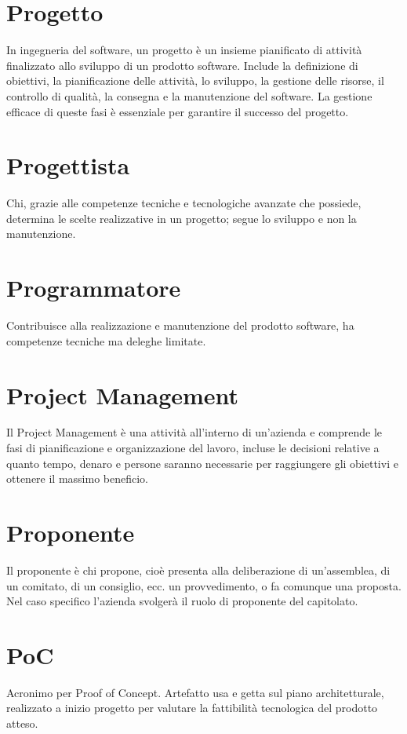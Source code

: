 \section{Progetto}\label{sec:Progetti}
In ingegneria del software, un progetto è un insieme pianificato di attività finalizzato allo sviluppo di un prodotto software. Include la definizione di obiettivi, la pianificazione delle attività, lo sviluppo, la gestione delle risorse, il controllo di qualità, la consegna e la manutenzione del software. La gestione efficace di queste fasi è essenziale per garantire il successo del progetto.

\section{Progettista}\label{sec:Progettisti}
Chi, grazie alle competenze tecniche e tecnologiche avanzate che possiede, determina le scelte realizzative in un progetto; segue lo sviluppo e non la manutenzione.

\section{Programmatore}\label{sec:Programmatori}
Contribuisce alla realizzazione e manutenzione del prodotto software, ha competenze tecniche ma deleghe limitate.

\section{Project Management}
Il Project Management è una attività all’interno di un’azienda e comprende le fasi di pianificazione e organizzazione del lavoro, incluse le decisioni relative a quanto tempo, denaro e persone saranno necessarie per raggiungere gli obiettivi e ottenere il massimo beneficio. 

\section{Proponente}\label{sec:Proponenti}
Il proponente è chi propone, cioè presenta alla deliberazione di un'assemblea, di un comitato, di un consiglio, ecc. un provvedimento, o fa comunque una proposta. Nel caso specifico l'azienda  svolgerà il ruolo di proponente del capitolato.

\section{PoC}\label{sec:Proof of Concept}
Acronimo per Proof of Concept. Artefatto usa e getta sul piano architetturale, realizzato a inizio progetto per valutare la fattibilità tecnologica del prodotto atteso.

